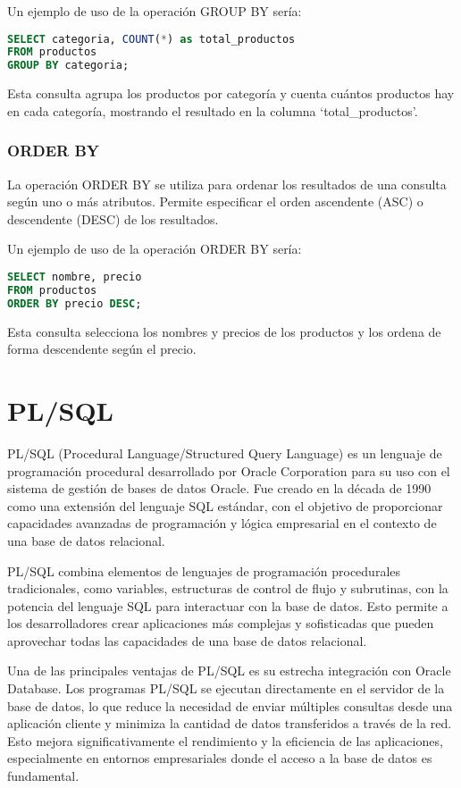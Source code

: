 \documentclass[executivepaper]{article}
\begin{document}
Un ejemplo de uso de la operación GROUP BY sería:

\begin{lstlisting}[language=SQL]
SELECT categoria, COUNT(*) as total_productos
FROM productos
GROUP BY categoria;
\end{lstlisting}

Esta consulta agrupa los productos por categoría y cuenta cuántos productos hay en cada categoría, mostrando el resultado en la columna \enquote*{total\_productos}.

\subsubsection*{ORDER BY}

La operación ORDER BY se utiliza para ordenar los resultados de una consulta según uno o más atributos. Permite especificar el orden ascendente (ASC) o descendente (DESC) de los resultados.

Un ejemplo de uso de la operación ORDER BY sería:

\begin{lstlisting}[language=SQL]
SELECT nombre, precio
FROM productos
ORDER BY precio DESC;
\end{lstlisting}

Esta consulta selecciona los nombres y precios de los productos y los ordena de forma descendente según el precio.

\newpage

\section{PL/SQL}
PL/SQL (Procedural Language/Structured Query Language) es un lenguaje de programación procedural desarrollado por Oracle Corporation para su uso con el sistema de gestión de bases de datos Oracle. Fue creado en la década de 1990 como una extensión del lenguaje SQL estándar, con el objetivo de proporcionar capacidades avanzadas de programación y lógica empresarial en el contexto de una base de datos relacional.

PL/SQL combina elementos de lenguajes de programación procedurales tradicionales, como variables, estructuras de control de flujo y subrutinas, con la potencia del lenguaje SQL para interactuar con la base de datos. Esto permite a los desarrolladores crear aplicaciones más complejas y sofisticadas que pueden aprovechar todas las capacidades de una base de datos relacional.

Una de las principales ventajas de PL/SQL es su estrecha integración con Oracle Database. Los programas PL/SQL se ejecutan directamente en el servidor de la base de datos, lo que reduce la necesidad de enviar múltiples consultas desde una aplicación cliente y minimiza la cantidad de datos transferidos a través de la red. Esto mejora significativamente el rendimiento y la eficiencia de las aplicaciones, especialmente en entornos empresariales donde el acceso a la base de datos es fundamental.
\end{document}
